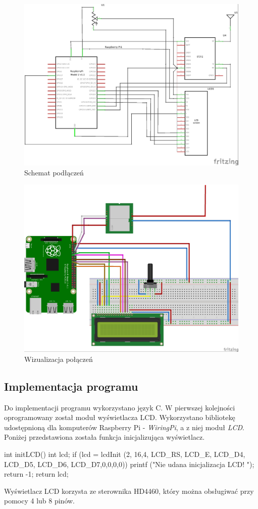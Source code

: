 \documentclass{article}
\begin{document}
			\begin{figure}[H]
				\centering
				\includegraphics[width=0.9\linewidth]{schemat-podlaczenia_schem.jpg}
				\caption{Schemat podłączeń}
			\end{figure}
			
			
			\begin{figure}[H]
				\centering
				\includegraphics[width=0.9\linewidth]{schemat-podlaczenia_bb.jpg}
				\caption{Wizualizacja połączeń}
			\end{figure}
			
	\subsection{Implementacja programu}
		Do implementacji programu wykorzystano język C. W pierwszej kolejności oprogramowany został moduł wyświetlacza LCD. Wykorzystano bibliotekę udostępnioną dla komputerów Raspberry Pi - \textit{WiringPi}, a z niej moduł \textit{LCD}. Poniżej przedstawiona została funkcja inicjalizująca wyświetlacz.
		\begin{verbatimtab}[4]
	int initLCD(){
		int lcd;
		if (lcd = lcdInit (2, 16,4, LCD_RS, LCD_E, LCD_D4, LCD_D5, LCD_D6, LCD_D7,0,0,0,0)){
			printf ("Nie udana inicjalizacja LCD! \n");
			return -1;
		}
		return lcd;
	}
		\end{verbatimtab}
		Wyświetlacz LCD korzysta ze sterownika HD4460, który można obsługiwać przy pomocy 4 lub 8 pinów. 
		
\end{document}
